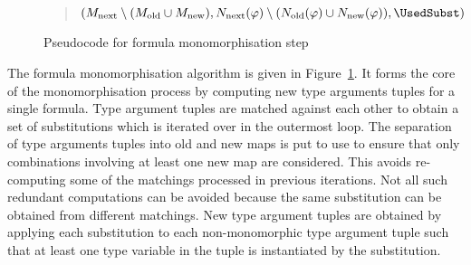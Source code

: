 \documentclass[]{ceurart}
\begin{document}
\begin{figure}
\begin{quote}
\begin{algorithm}[H]
{   

   \BlankLine

   \Return \((M_{\text{next}}\setminus (M_{\text{old}} \cup M_{\text{new}}), N_{\text{next}}(\varphi)\setminus (N_{\text{old}}(\varphi)\cup N_{\text{new}}(\varphi)), \UsedSubst)\)
}

\end{algorithm}
\end{quote}
\caption{Pseudocode for formula monomorphisation step}
\label{mono_step}
\end{figure}


The formula monomorphisation algorithm is given in Figure~\ref{mono_step}. It forms the core of the monomorphisation process by computing new type arguments tuples for a single formula. Type argument tuples are matched against each other to obtain a set of substitutions which is iterated over in the outermost loop. 
The separation of type arguments tuples into old and new maps is put to use to ensure that only combinations involving at least one new map are considered. This avoids re-computing some of the matchings processed in previous iterations. Not all such redundant computations can be avoided because the same substitution can be obtained from different matchings. New type argument tuples are obtained by applying each substitution to each non-monomorphic type argument tuple such that at least one type variable in the tuple is instantiated by the substitution.
\end{document}
